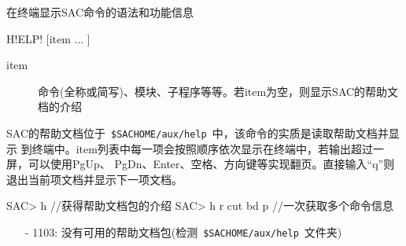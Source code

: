 \label{cmd:help}

在终端显示SAC命令的语法和功能信息

\begin{SACSTX}
H!ELP! [item ... ]
\end{SACSTX}

\begin{description}
\item [item] 命令(全称或简写)、模块、子程序等等。若item为空，则显示SAC的帮助文档的介绍
\end{description}

SAC的帮助文档位于~\verb+$SACHOME/aux/help+~中，该命令的实质是读取帮助文档并显示
到终端中。item列表中每一项会按照顺序依次显示在终端中，若输出超过一屏，可以使用PgUp、
PgDn、Enter、空格、方向键等实现翻页。直接输入``q''则退出当前项文档并显示下一项文档。

\begin{SACCode}
SAC> h                  //获得帮助文档包的介绍
SAC> h r cut bd p       //一次获取多个命令信息
\end{SACCode}

\begin{itemize}
\item[-]1103: 没有可用的帮助文档包(检测~\verb+$SACHOME/aux/help+~文件夹)
\end{itemize}
